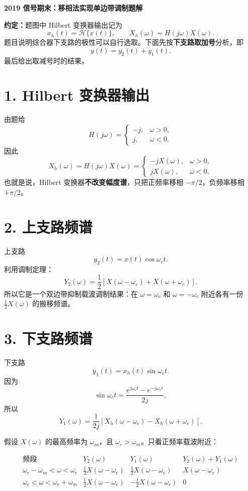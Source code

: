 \documentclass[UTF8,11pt]{ctexart}
\begin{document}
\begin{center}
{\Large \bfseries 2019 信号期末：移相法实现单边带调制题解}
\end{center}

\textbf{约定：}题图中 Hilbert 变换器输出记为
\[
x_h(t)=\mathcal{H}\{x(t)\},
\qquad
X_h(\omega)=H(j\omega)X(\omega).
\]
题目说明综合器下支路的极性可以自行选取。下面先按\textbf{下支路取加号}分析，即
\[
y(t)=y_2(t)+y_1(t).
\]
最后给出取减号时的结果。

\section*{1. Hilbert 变换器输出}

由题给
\[
H(j\omega)=
\begin{cases}
-j, & \omega>0,\\
j, & \omega<0.
\end{cases}
\]
因此
\[
X_h(\omega)=H(j\omega)X(\omega)
=
\begin{cases}
-jX(\omega), & \omega>0,\\
jX(\omega), & \omega<0.
\end{cases}
\]
也就是说，Hilbert 变换器\textbf{不改变幅度谱}，只把正频率移相 $-\pi/2$，负频率移相 $+\pi/2$。

\section*{2. 上支路频谱}

上支路
\[
y_2(t)=x(t)\cos \omega_c t.
\]
利用调制定理：
\[
Y_2(\omega)
=\frac{1}{2}\left[X(\omega-\omega_c)+X(\omega+\omega_c)\right].
\]
所以它是一个双边带抑制载波调制结果：在 $\omega=\omega_c$ 和 $\omega=-\omega_c$ 附近各有一份 $\frac12 X(\omega)$ 的搬移频谱。

\section*{3. 下支路频谱}

下支路
\[
y_1(t)=x_h(t)\sin \omega_c t.
\]
因为
\[
\sin\omega_c t=\frac{e^{j\omega_c t}-e^{-j\omega_c t}}{2j},
\]
所以
\[
Y_1(\omega)
=\frac{1}{2j}
\left[
X_h(\omega-\omega_c)-X_h(\omega+\omega_c)
\right].
\]

假设 $X(\omega)$ 的最高频率为 $\omega_m$，且 $\omega_c>\omega_m$。只看正频率载波附近：

\[
\begin{array}{c|c|c|c}
\text{频段} & Y_2(\omega) & Y_1(\omega) & Y_2(\omega)+Y_1(\omega)\\
\hline
\omega_c-\omega_m<\omega<\omega_c
& \frac12X(\omega-\omega_c)
& \frac12X(\omega-\omega_c)
& X(\omega-\omega_c)\\
\omega_c<\omega<\omega_c+\omega_m
& \frac12X(\omega-\omega_c)
& -\frac12X(\omega-\omega_c)
& 0
\end{array}
\]
\end{document}
